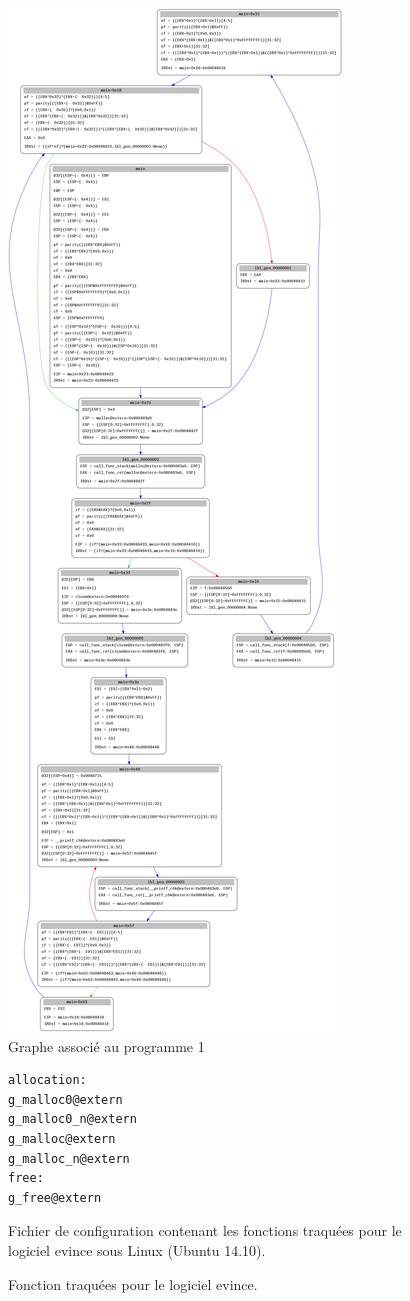 \begin{figure}[h]
    \centering
    \includegraphics[scale=0.125]{images/simple-graph.png}
    \caption{Graphe associé au programme 1}
\end{figure}
\begin{figure}[h]
    \centering
    \begin {lstlisting}[frame=single]
allocation:
g_malloc0@extern
g_malloc0_n@extern
g_malloc@extern
g_malloc_n@extern
free:
g_free@extern
    \end{lstlisting}
    \caption{Fonction traquées pour le logiciel evince. }
    Fichier de configuration contenant les fonctions traquées pour le logiciel
evince sous Linux (Ubuntu 14.10).
\end{figure}

